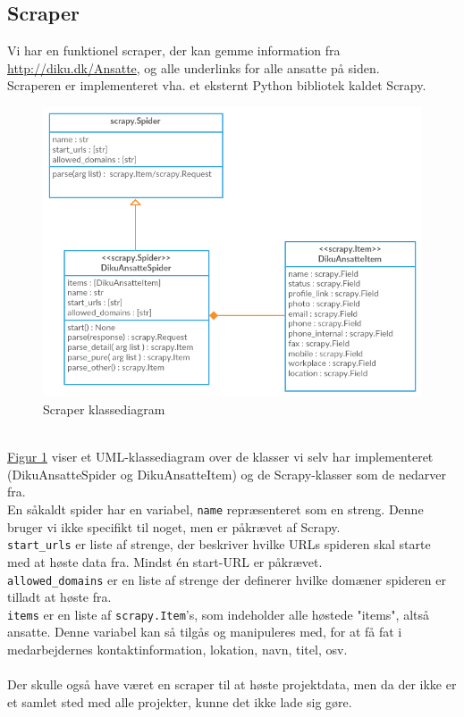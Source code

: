 \documentclass[12pt]{article}
\begin{document}
\subsection{Scraper}
Vi har en funktionel scraper, der kan gemme information fra \url{http://diku.dk/Ansatte}, og alle underlinks for alle ansatte på siden.\\
Scraperen er implementeret vha. et eksternt Python bibliotek kaldet Scrapy.

\begin{figure}[H]
    \centering
    \includegraphics[scale=0.5]{scraper_class_diagram.png}
    \caption{Scraper klassediagram}
    \label{fig:scraper_class_diagram}
\end{figure}~\\
\hyperref[fig:scraper_class_diagram]{Figur \ref*{fig:scraper_class_diagram}} viser et UML-klassediagram over de klasser vi selv har implementeret (DikuAnsatteSpider og DikuAnsatteItem) og de Scrapy-klasser som de nedarver fra.\\
En såkaldt spider har en variabel, \texttt{name} repræsenteret som en streng. Denne bruger vi ikke specifikt til noget, men er påkrævet af Scrapy.\\
\texttt{start\_urls} er liste af strenge, der beskriver hvilke URLs spideren skal starte med at høste data fra. Mindst én start-URL er påkrævet.\\
\texttt{allowed\_domains} er en liste af strenge der definerer hvilke domæner spideren er tilladt at høste fra.\\
\texttt{items} er en liste af \texttt{scrapy.Item}'s, som indeholder alle høstede "items", altså ansatte. Denne variabel kan så tilgås og manipuleres med, for at få fat i medarbejdernes kontaktinformation, lokation, navn, titel, osv.\\
\\
Der skulle også have været en scraper til at høste projektdata, men da der ikke er et samlet sted med alle projekter, kunne det ikke lade sig gøre.
\end{document}

